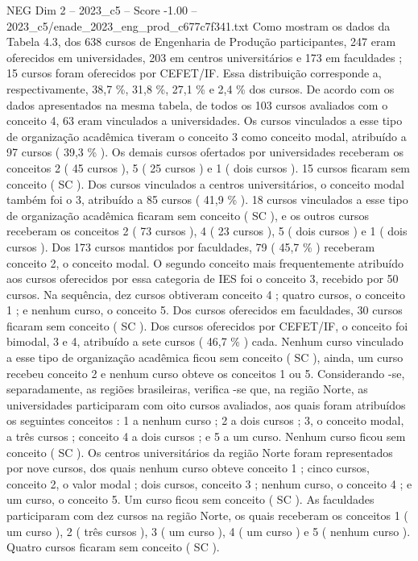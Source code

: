 \begin{textsample}{NEG Dim 2 – 2023\_c5 – Score -1.00 – 2023\_c5/enade\_2023\_eng\_prod\_c677c7f341.txt}
Como mostram os dados da Tabela 4.3, dos 638 cursos de Engenharia de Produção participantes, 247 eram oferecidos em universidades, 203 em centros universitários e 173 em faculdades ; 15 cursos foram oferecidos por CEFET/IF.
Essa distribuição corresponde a, respectivamente, 38,7 \%, 31,8 \%, 27,1 \% e 2,4 \% dos cursos.
De acordo com os dados apresentados na mesma tabela, de todos os 103 cursos avaliados com o conceito 4, 63 eram vinculados a universidades.
Os cursos vinculados a esse tipo de organização acadêmica tiveram o conceito 3 como conceito modal, atribuído a 97 cursos ( 39,3 \% ).
Os demais cursos ofertados por universidades receberam os conceitos 2 ( 45 cursos ), 5 ( 25 cursos ) e 1 ( dois cursos ). 15 cursos ficaram sem conceito ( SC ).
Dos cursos vinculados a centros universitários, o conceito modal também foi o 3, atribuído a 85 cursos ( 41,9 \% ). 18 cursos vinculados a esse tipo de organização acadêmica ficaram sem conceito ( SC ), e os outros cursos receberam os conceitos 2 ( 73 cursos ), 4 ( 23 cursos ), 5 ( dois cursos ) e 1 ( dois cursos ).
Dos 173 cursos mantidos por faculdades, 79 ( 45,7 \% ) receberam conceito 2, o conceito modal.
O segundo conceito mais frequentemente atribuído aos cursos oferecidos por essa categoria de IES foi o conceito 3, recebido por 50 cursos.
Na sequência, dez cursos obtiveram conceito 4 ; quatro cursos, o conceito 1 ; e nenhum curso, o conceito 5.
Dos cursos oferecidos em faculdades, 30 cursos ficaram sem conceito ( SC ).
Dos cursos oferecidos por CEFET/IF, o conceito foi bimodal, 3 e 4, atribuído a sete cursos ( 46,7 \% ) cada.
Nenhum curso vinculado a esse tipo de organização acadêmica ficou sem conceito ( SC ), ainda, um curso recebeu conceito 2 e nenhum curso obteve os conceitos 1 ou 5.
Considerando -se, separadamente, as regiões brasileiras, verifica -se que, na região Norte, as universidades participaram com oito cursos avaliados, aos quais foram atribuídos os seguintes conceitos : 1 a nenhum curso ; 2 a dois cursos ; 3, o conceito modal, a três cursos ; conceito 4 a dois cursos ; e 5 a um curso.
Nenhum curso ficou sem conceito ( SC ).
Os centros universitários da região Norte foram representados por nove cursos, dos quais nenhum curso obteve conceito 1 ; cinco cursos, conceito 2, o valor modal ; dois cursos, conceito 3 ; nenhum curso, o conceito 4 ; e um curso, o conceito 5.
Um curso ficou sem conceito ( SC ).
As faculdades participaram com dez cursos na região Norte, os quais receberam os conceitos 1 ( um curso ), 2 ( três cursos ), 3 ( um curso ), 4 ( um curso ) e 5 ( nenhum curso ).
Quatro cursos ficaram sem conceito ( SC ).

\end{textsample}
